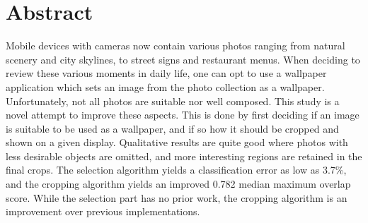 %

\newpage
\vspace{3cm}

\chapter*{Abstract}
\noindent

Mobile devices with cameras now contain various photos ranging from natural
scenery and city skylines, to street signs and restaurant menus.
When deciding to review these various moments in daily life, one can opt to use
a wallpaper application which sets an image from the photo collection as a
wallpaper.
Unfortunately, not all photos are suitable nor well composed.
This study is a novel attempt to improve these aspects.
This is done by first deciding if an image is suitable to be used as a wallpaper,
and if so how it should be cropped and shown on a given display.
Qualitative results are quite good where photos with less desirable objects are
omitted, and more interesting regions are retained in the final crops.
The selection algorithm yields a classification error as low as 3.7\%, and the
cropping algorithm yields an improved 0.782 median maximum overlap score.
While the selection part has no prior work, the cropping algorithm is an
improvement over previous implementations.
